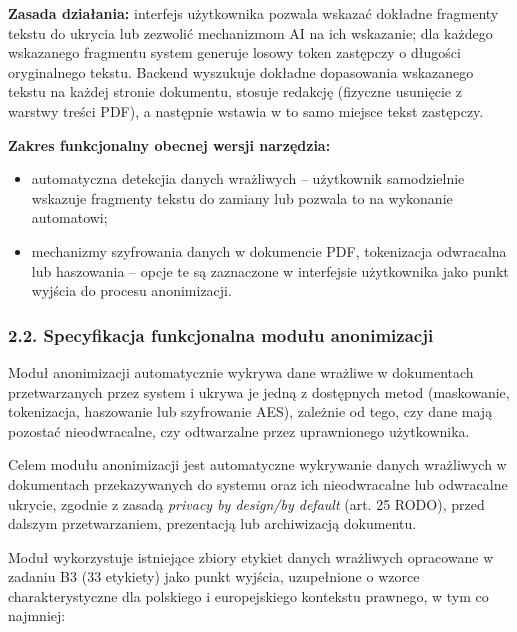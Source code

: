 \textbf{Zasada działania:} interfejs użytkownika pozwala wskazać dokładne fragmenty tekstu do ukrycia lub zezwolić mechanizmom AI na ich wskazanie; dla każdego wskazanego fragmentu system generuje losowy token zastępczy o długości oryginalnego tekstu. Backend wyszukuje dokładne dopasowania wskazanego tekstu na każdej stronie dokumentu, stosuje redakcję (fizyczne usunięcie z warstwy treści PDF), a następnie wstawia w to samo miejsce tekst zastępczy.

\textbf{Zakres funkcjonalny obecnej wersji narzędzia:}
\begin{itemize}
    \item  automatyczna detekcjia danych wrażliwych -- użytkownik samodzielnie wskazuje fragmenty tekstu do zamiany lub pozwala to na wykonanie automatowi;
    
    \item  mechanizmy szyfrowania danych w dokumencie PDF, tokenizacja odwracalna lub haszowania -- opcje te są zaznaczone w interfejsie użytkownika jako punkt wyjścia do procesu anonimizacji.
\end{itemize}


\subsubsection*{2.2. Specyfikacja funkcjonalna modułu anonimizacji}

Moduł anonimizacji automatycznie wykrywa dane wrażliwe w dokumentach przetwarzanych przez system i ukrywa je jedną z dostępnych metod (maskowanie, tokenizacja, haszowanie lub szyfrowanie AES), zależnie od tego, czy dane mają pozostać nieodwracalne, czy odtwarzalne przez uprawnionego użytkownika. 


Celem modułu anonimizacji jest automatyczne wykrywanie danych wrażliwych w dokumentach przekazywanych do systemu oraz ich nieodwracalne lub odwracalne ukrycie, zgodnie z zasadą \emph{privacy by design/by default} (art. 25 RODO), przed dalszym przetwarzaniem, prezentacją lub archiwizacją dokumentu.


Moduł wykorzystuje istniejące zbiory etykiet danych wrażliwych opracowane w zadaniu B3 (33 etykiety) jako punkt wyjścia, uzupełnione o wzorce charakterystyczne dla polskiego i europejskiego kontekstu prawnego, w tym co najmniej:

